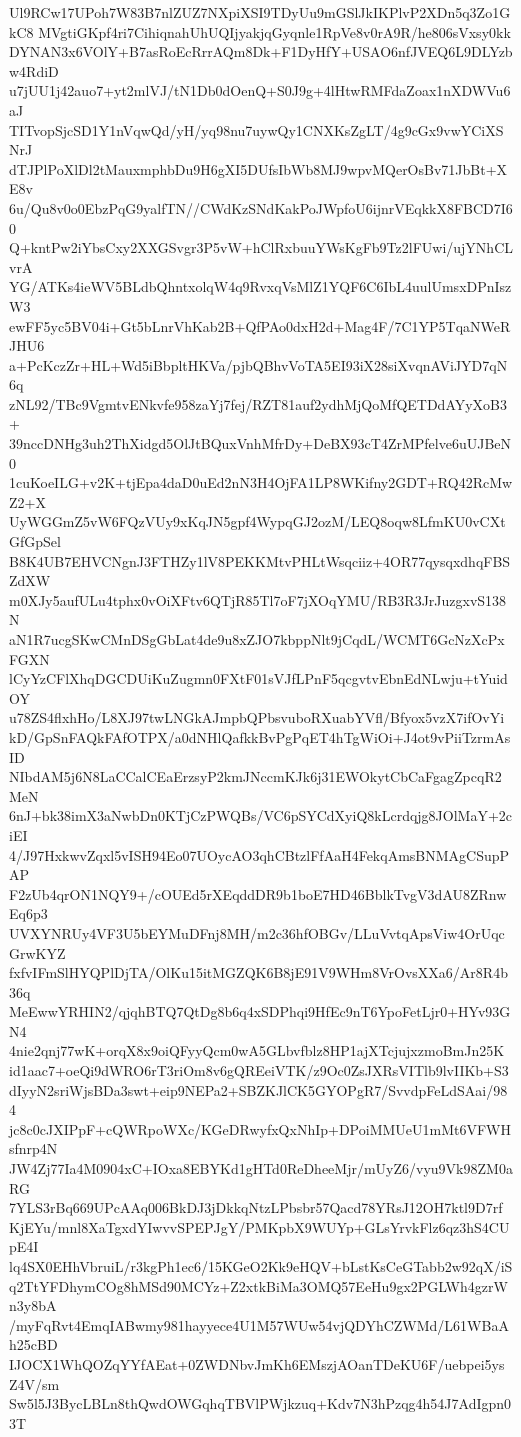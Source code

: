 Ul9RCw17UPoh7W83B7nlZUZ7NXpiXSI9TDyUu9mGSlJkIKPlvP2XDn5q3Zo1GkC8
MVgtiGKpf4ri7CihiqnahUhUQIjyakjqGyqnle1RpVe8v0rA9R/he806sVxsy0kk
DYNAN3x6VOlY+B7asRoEcRrrAQm8Dk+F1DyHfY+USAO6nfJVEQ6L9DLYzbw4RdiD
u7jUU1j42auo7+yt2mlVJ/tN1Db0dOenQ+S0J9g+4lHtwRMFdaZoax1nXDWVu6aJ
TITvopSjcSD1Y1nVqwQd/yH/yq98nu7uywQy1CNXKsZgLT/4g9cGx9vwYCiXSNrJ
dTJPlPoXlDl2tMauxmphbDu9H6gXI5DUfsIbWb8MJ9wpvMQerOsBv71JbBt+XE8v
6u/Qu8v0o0EbzPqG9yalfTN//CWdKzSNdKakPoJWpfoU6ijnrVEqkkX8FBCD7I60
Q+kntPw2iYbsCxy2XXGSvgr3P5vW+hClRxbuuYWsKgFb9Tz2lFUwi/ujYNhCLvrA
YG/ATKs4ieWV5BLdbQhntxolqW4q9RvxqVsMlZ1YQF6C6IbL4uulUmsxDPnIszW3
ewFF5yc5BV04i+Gt5bLnrVhKab2B+QfPAo0dxH2d+Mag4F/7C1YP5TqaNWeRJHU6
a+PcKczZr+HL+Wd5iBbpltHKVa/pjbQBhvVoTA5EI93iX28siXvqnAViJYD7qN6q
zNL92/TBc9VgmtvENkvfe958zaYj7fej/RZT81auf2ydhMjQoMfQETDdAYyXoB3+
39nccDNHg3uh2ThXidgd5OlJtBQuxVnhMfrDy+DeBX93cT4ZrMPfelve6uUJBeN0
1cuKoeILG+v2K+tjEpa4daD0uEd2nN3H4OjFA1LP8WKifny2GDT+RQ42RcMwZ2+X
UyWGGmZ5vW6FQzVUy9xKqJN5gpf4WypqGJ2ozM/LEQ8oqw8LfmKU0vCXtGfGpSel
B8K4UB7EHVCNgnJ3FTHZy1lV8PEKKMtvPHLtWsqciiz+4OR77qysqxdhqFBSZdXW
m0XJy5aufULu4tphx0vOiXFtv6QTjR85Tl7oF7jXOqYMU/RB3R3JrJuzgxvS138N
aN1R7ucgSKwCMnDSgGbLat4de9u8xZJO7kbppNlt9jCqdL/WCMT6GcNzXcPxFGXN
lCyYzCFlXhqDGCDUiKuZugmn0FXtF01sVJfLPnF5qcgvtvEbnEdNLwju+tYuidOY
u78ZS4flxhHo/L8XJ97twLNGkAJmpbQPbsvuboRXuabYVfl/Bfyox5vzX7ifOvYi
kD/GpSnFAQkFAfOTPX/a0dNHlQafkkBvPgPqET4hTgWiOi+J4ot9vPiiTzrmAsID
NIbdAM5j6N8LaCCalCEaErzsyP2kmJNccmKJk6j31EWOkytCbCaFgagZpcqR2MeN
6nJ+bk38imX3aNwbDn0KTjCzPWQBs/VC6pSYCdXyiQ8kLcrdqjg8JOlMaY+2ciEI
4/J97HxkwvZqxl5vISH94Eo07UOycAO3qhCBtzlFfAaH4FekqAmsBNMAgCSupPAP
F2zUb4qrON1NQY9+/cOUEd5rXEqddDR9b1boE7HD46BblkTvgV3dAU8ZRnwEq6p3
UVXYNRUy4VF3U5bEYMuDFnj8MH/m2c36hfOBGv/LLuVvtqApsViw4OrUqcGrwKYZ
fxfvIFmSlHYQPlDjTA/OlKu15itMGZQK6B8jE91V9WHm8VrOvsXXa6/Ar8R4b36q
MeEwwYRHIN2/qjqhBTQ7QtDg8b6q4xSDPhqi9HfEc9nT6YpoFetLjr0+HYv93GN4
4nie2qnj77wK+orqX8x9oiQFyyQcm0wA5GLbvfblz8HP1ajXTcjujxzmoBmJn25K
id1aac7+oeQi9dWRO6rT3riOm8v6gQREeiVTK/z9Oc0ZsJXRsVITlb9lvIIKb+S3
dIyyN2sriWjsBDa3swt+eip9NEPa2+SBZKJlCK5GYOPgR7/SvvdpFeLdSAai/984
jc8c0cJXIPpF+cQWRpoWXc/KGeDRwyfxQxNhIp+DPoiMMUeU1mMt6VFWHsfnrp4N
JW4Zj77Ia4M0904xC+IOxa8EBYKd1gHTd0ReDheeMjr/mUyZ6/vyu9Vk98ZM0aRG
7YLS3rBq669UPcAAq006BkDJ3jDkkqNtzLPbsbr57Qacd78YRsJ12OH7ktl9D7rf
KjEYu/mnl8XaTgxdYIwvvSPEPJgY/PMKpbX9WUYp+GLsYrvkFlz6qz3hS4CUpE4I
lq4SX0EHhVbruiL/r3kgPh1ec6/15KGeO2Kk9eHQV+bLstKsCeGTabb2w92qX/iS
q2TtYFDhymCOg8hMSd90MCYz+Z2xtkBiMa3OMQ57EeHu9gx2PGLWh4gzrWn3y8bA
/myFqRvt4EmqIABwmy981hayyece4U1M57WUw54vjQDYhCZWMd/L61WBaAh25cBD
IJOCX1WhQOZqYYfAEat+0ZWDNbvJmKh6EMszjAOanTDeKU6F/uebpei5ysZ4V/sm
Sw5l5J3BycLBLn8thQwdOWGqhqTBVlPWjkzuq+Kdv7N3hPzqg4h54J7AdIgpn03T
